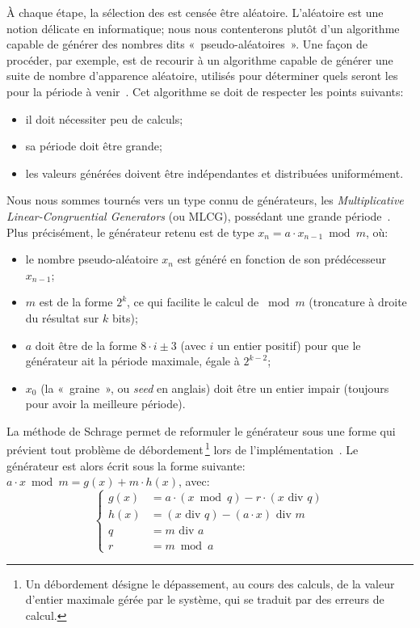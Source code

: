 À chaque étape, la sélection des \cns est censée être aléatoire.
L'aléatoire est une notion délicate en informatique; nous nous contenterons plutôt d'un algorithme capable de générer des nombres dits «~pseudo-aléatoires~».
Une façon de procéder, par exemple, est de recourir à un algorithme capable de générer une suite de nombre d'apparence aléatoire, utilisés pour déterminer quels seront les \cns pour la période à venir~\cite{GMT12}.
Cet algorithme se doit de respecter les points suivants:
\begin{itemize}
    \item il doit nécessiter peu de calculs;
    \item sa période doit être grande;
    \item les valeurs générées doivent être indépendantes et distribuées uniformément.
\end{itemize}
Nous nous sommes tournés vers un type connu de générateurs, les \textit{Multiplicative Linear-Congruential Generators} (ou MLCG), possédant une grande période~\cite{RJ91}.
Plus précisément, le générateur retenu est de type $x_n = a\cdot x_{n-1}\bmod m$, où:
\begin{itemize}
    \item le nombre pseudo-aléatoire $x_n$ est généré en fonction de son prédécesseur $x_{n-1}$;
    \item $m$ est de la forme $2^k$, ce qui facilite le calcul de $\bmod m$ (troncature à droite du résultat sur $k$ bits);
    \item $a$ doit être de la forme $8\cdot i\pm3$ (avec $i$ un entier positif) pour que le générateur ait la période maximale, égale à $2^{k-2}$;
    \item $x_0$ (la «~graine~», ou \textit{seed} en anglais) doit être un entier impair (toujours pour avoir la meilleure période).
\end{itemize}
La méthode de Schrage permet de reformuler le générateur sous une forme qui prévient tout problème de débordement\,\footnote{Un débordement désigne le dépassement, au cours des calculs, de la valeur d'entier maximale gérée par le système, qui se traduit par des erreurs de calcul.} lors de l'implémentation~\cite{RJ91}.
Le générateur est alors écrit sous la forme suivante: $a\cdot x\bmod m=g(x)+m\cdot h(x)$, avec:
\[\left\{
    \begin{aligned}
        g(x) & =a\cdot(x\bmod q)-r\cdot(x\mbox{~div~}q)\\
        h(x) & =(x\mbox{~div~}q)-(a\cdot x)\mbox{~div~}m\\
        q    & =m\mbox{~div~}a\\
        r    & =m\bmod a
    \end{aligned}
\right.\]
